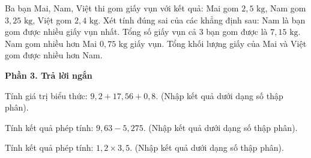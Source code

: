 \begin{ex} %
Ba bạn Mai, Nam, Việt thi gom giấy vụn với kết quả: Mai gom $2{,}5\text{ kg}$, Nam gom $3{,}25\text{ kg}$, Việt gom $2{,}4\text{ kg}$. Xét tính đúng sai của các khẳng định sau:
\choiceTF
{\True Nam là bạn gom được nhiều giấy vụn nhất.}
{Tổng số giấy vụn cả $3$ bạn gom được là $7{,}15\text{ kg}$.}
{\True Nam gom nhiều hơn Mai $0{,}75\text{ kg}$ giấy vụn.}
{\True Tổng khối lượng giấy của Mai và Việt gom được nhiều hơn Nam.}
\end{ex}

\textbf{Phần 3. Trả lời ngắn}

\begin{ex} %
Tính giá trị biểu thức: $9{,}2 + 17{,}56 + 0{,}8$. (Nhập kết quả dưới dạng số thập phân).
\end{ex}

\begin{ex} %
Tính kết quả phép tính: $9{,}63 - 5{,}275$. (Nhập kết quả dưới dạng số thập phân).
\end{ex}

\begin{ex} %
Tính kết quả phép tính: $1{,}2 \times 3{,}5$. (Nhập kết quả dưới dạng số thập phân).
\end{ex}

